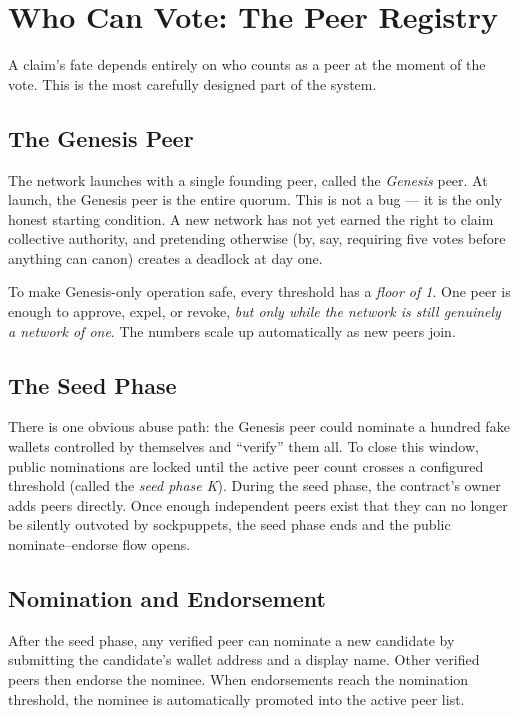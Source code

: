 \documentclass[11pt,a4paper]{article}
\begin{document}
\section{Who Can Vote: The Peer Registry}

A claim's fate depends entirely on who counts as a peer at the moment
of the vote. This is the most carefully designed part of the system.

\subsection{The Genesis Peer}

The network launches with a single founding peer, called the
\emph{Genesis} peer. At launch, the Genesis peer is the entire
quorum. This is not a bug --- it is the only honest starting
condition. A new network has not yet earned the right to claim
collective authority, and pretending otherwise (by, say, requiring
five votes before anything can canon) creates a deadlock at
day one.

To make Genesis-only operation safe, every threshold has a
\emph{floor of 1}. One peer is enough to approve, expel, or revoke,
\emph{but only while the network is still genuinely a network of
one}. The numbers scale up automatically as new peers join.

\subsection{The Seed Phase}

There is one obvious abuse path: the Genesis peer could nominate a
hundred fake wallets controlled by themselves and ``verify'' them
all. To close this window, public nominations are locked until the
active peer count crosses a configured threshold (called the
\emph{seed phase K}). During the seed phase, the contract's owner
adds peers directly. Once enough independent peers exist that they
can no longer be silently outvoted by sockpuppets, the seed phase
ends and the public nominate--endorse flow opens.

\subsection{Nomination and Endorsement}

After the seed phase, any verified peer can nominate a new candidate
by submitting the candidate's wallet address and a display name. Other
verified peers then endorse the nominee. When endorsements reach the
nomination threshold, the nominee is automatically promoted into the
active peer list.
\end{document}
